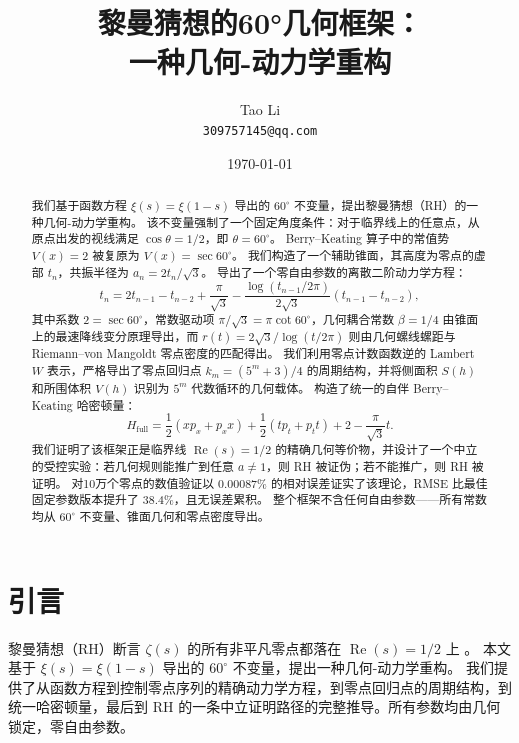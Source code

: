 \documentclass[12pt,a4paper]{article}
\title{黎曼猜想的60°几何框架：\\一种几何-动力学重构}
\author{Tao Li \\ \texttt{309757145@qq.com}}
\date{\today}
\begin{document}
\maketitle

\begin{abstract}
我们基于函数方程 $\xi(s)=\xi(1-s)$ 导出的 $60^\circ$ 不变量，提出黎曼猜想（RH）的一种几何-动力学重构。
该不变量强制了一个固定角度条件：对于临界线上的任意点，从原点出发的视线满足 $\cos\theta = 1/2$，即 $\theta = 60^\circ$。
Berry--Keating 算子中的常值势 $V(x)=2$ 被复原为 $V(x)=\sec 60^\circ$。
我们构造了一个辅助锥面，其高度为零点的虚部 $t_n$，共振半径为 $a_n = 2t_n/\sqrt{3}$。
导出了一个零自由参数的离散二阶动力学方程：
\begin{equation}
t_n = 2t_{n-1} - t_{n-2} + \frac{\pi}{\sqrt{3}} - \frac{\log(t_{n-1}/2\pi)}{2\sqrt{3}}(t_{n-1} - t_{n-2}),
\end{equation}
其中系数 $2 = \sec 60^\circ$，常数驱动项 $\pi/\sqrt{3} = \pi\cot 60^\circ$，几何耦合常数 $\beta = 1/4$ 由锥面上的最速降线变分原理导出，而 $r(t) = 2\sqrt{3}/\log(t/2\pi)$ 则由几何螺线螺距与 Riemann--von Mangoldt 零点密度的匹配得出。
我们利用零点计数函数逆的 Lambert $W$ 表示，严格导出了零点回归点 $k_m = (5^m+3)/4$ 的周期结构，并将侧面积 $S(h)$ 和所围体积 $V(h)$ 识别为 $5^m$ 代数循环的几何载体。
构造了统一的自伴 Berry--Keating 哈密顿量：
\begin{equation}
H_{\text{full}} = \frac{1}{2}(x p_x + p_x x) + \frac{1}{2}(t p_t + p_t t) + 2 - \frac{\pi}{\sqrt{3}}t.
\end{equation}
我们证明了该框架正是临界线 $\operatorname{Re}(s)=1/2$ 的精确几何等价物，并设计了一个中立的受控实验：若几何规则能推广到任意 $a \neq 1$，则 RH 被证伪；若不能推广，则 RH 被证明。
对10万个零点的数值验证以 $0.00087\%$ 的相对误差证实了该理论，RMSE 比最佳固定参数版本提升了 38.4\%，且无误差累积。
整个框架不含任何自由参数——所有常数均从 $60^\circ$ 不变量、锥面几何和零点密度导出。
\end{abstract}

\section{引言}

黎曼猜想（RH）断言 $\zeta(s)$ 的所有非平凡零点都落在 $\operatorname{Re}(s)=1/2$ 上 \cite{riemann}。
本文基于 $\xi(s)=\xi(1-s)$ 导出的 $60^\circ$ 不变量，提出一种几何-动力学重构。
我们提供了从函数方程到控制零点序列的精确动力学方程，到零点回归点的周期结构，到统一哈密顿量，最后到 RH 的一条中立证明路径的完整推导。所有参数均由几何锁定，零自由参数。
\end{document}
